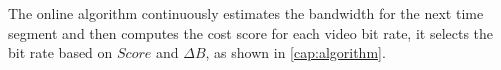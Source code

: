 The online algorithm continuously estimates the bandwidth for the next time segment and then computes the cost score for each video bit rate, it selects the bit rate based on $Score$ and $\Delta B$, as shown in \autoref{cap:algorithm}.



\begin{comment}

\begin{algorithm}[h]
\SetAlgoLined
 \KwData{ $C$: Prediction available bandwidth\newline$C'$: Prediction lower bound with 90\% confidence\newline$B'$: Current buffer occupancy\newline$t_s$: Last time video has switched bit rate\newline$i'$: Current video bit rate}
 \KwResult{$Rate$: Rate for next chunk}
\uIf{$\frac{R_1}{C} \leq 1$}{
$Rate = R_1$\;} 
\Else{
$Score =0$\;
\For{i \leftarrow 1 to M} {
$\mathbb{E}[\Delta B] = \ceil{ (\frac{R_i}{C'}-1)\cdot 4} $\;
$\phi =|i-i'|$\;
$Score_i = \frac{R_i}{C} -\mathbb{E}[\Delta B] \cdot \frac{1}{B'} - \phi \cdot EXP(t_s-t_{now})$\;
\uIf{$Score\leq Score_i$}
{
$Score=Score_i$\;
$Rate = R_i$} 
}
}
\caption{Rate Selection}
\end{algorithm}


for (i) is that the cost of making bit rate jump should depend on when is the last time we make bit rate change. Tht cost for bit rate change should be less if the last bit rate change is long time ago. The reason for (ii) 
\begin{algorithm}[h]
\SetAlgoLined
 \KwData{ $C$: Link capacity for next 4 seconds\newline $B_{now}$: Current Buffer Occupancy\newline$V$: Reservior Size\newline $\Delta B$: buffer occupancy change in last time segment}
 \KwResult{$Rate$: Rate for next chunk }
\uIf{$B_{now}>V$}{
$Rate$ = BBA\_steady()} 
\Else{
$Rate_{infer} = \min\{Rate_{max}, 0.8*C \}$\;
\emph{if the buffer is filled at a certain pace, pick the inferred rate}\;
\uIf{$\Delta B >0.3(1-\frac{B_{now}}{V})*V$}{
$Rate = Rate_{infer}$
} \Else {\emph{Othewise, pick one level below}
$Rate = \max\{Rate_{min}, Rate_{infer-1}\}$
}
}
Update(Cushion Size, Reservior Size)\;
\caption{BBA(2) PLUS Rate Selection}
\end{algorithm}


\end{comment}
